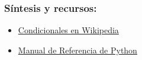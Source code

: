 \documentclass{beamer}
\begin{document}

\begin{frame}
\frametitle{Síntesis y recursos:}

\begin{itemize}
\item \href{https://en.wikipedia.org/wiki/Conditional_(computer_programming)}{Condicionales en Wikipedia}
\item \href{https://docs.python.org/3/reference/index.html}{Manual de Referencia de Python} 

\end{itemize}
\end{frame}
\end{document}
